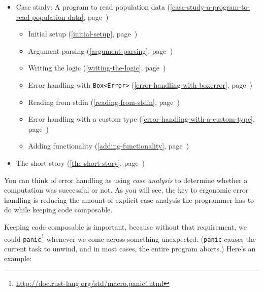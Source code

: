 \documentclass[a4paper,]{book}
\renewcommand*{\hyperref}[2][\ar]{%
  \def\ar{#2}%
  #2 (\autoref{#1}, page~\pageref{#1})}
\renewcommand{\href}[2]{#2\footnote{\url{#1}}}
\providecommand{\tightlist}{%
  \setlength{\itemsep}{0pt}\setlength{\parskip}{0pt}}
\begin{document}
\begin{itemize}
  \begin{itemize}
  \tightlist
  \item
    \hyperref[the-error-trait]{The \texttt{Error} trait}
  \item
    \hyperref[the-from-trait]{The \texttt{From} trait}
  \item
    \hyperref[the-real-try-macro]{The real \texttt{try!} macro}
  \item
    \hyperref[composing-custom-error-types]{Composing custom error
    types}
  \item
    \hyperref[advice-for-library-writers]{Advice for library writers}
  \end{itemize}
\item
  \hyperref[case-study-a-program-to-read-population-data]{Case study: A
  program to read population data}

  \begin{itemize}
  \tightlist
  \item
    \hyperref[initial-setup]{Initial setup}
  \item
    \hyperref[argument-parsing]{Argument parsing}
  \item
    \hyperref[writing-the-logic]{Writing the logic}
  \item
    \hyperref[error-handling-with-boxerror]{Error handling with
    \texttt{Box\textless{}Error\textgreater{}}}
  \item
    \hyperref[reading-from-stdin]{Reading from stdin}
  \item
    \hyperref[error-handling-with-a-custom-type]{Error handling with a
    custom type}
  \item
    \hyperref[adding-functionality]{Adding functionality}
  \end{itemize}
\item
  \hyperref[the-short-story]{The short story}
\end{itemize}


You can think of error handling as using \emph{case analysis} to
determine whether a computation was successful or not. As you will see,
the key to ergonomic error handling is reducing the amount of explicit
case analysis the programmer has to do while keeping code composable.

Keeping code composable is important, because without that requirement,
we could
\href{http://doc.rust-lang.org/std/macro.panic!.html}{\texttt{panic}}
whenever we come across something unexpected. (\texttt{panic} causes the
current task to unwind, and in most cases, the entire program aborts.)
Here's an example:
\end{document}
